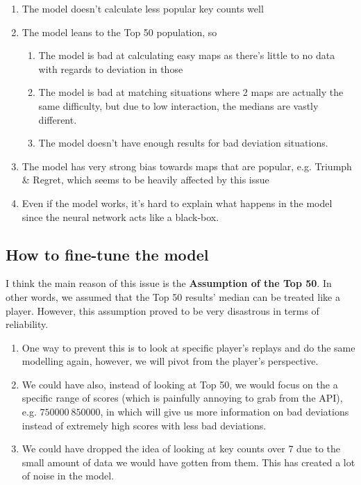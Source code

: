 \begin{enumerate}
	\item The model doesn't calculate less popular key counts well
	\item The model leans to the Top 50 population, so
	\begin{enumerate}
		\item The model is bad at calculating easy maps as there's little to no data with regards to deviation in those
		\item The model is bad at matching situations where 2 maps are actually the same difficulty, but due to low interaction, the medians are vastly different.
		\item The model doesn't have enough results for bad deviation situations.
	\end{enumerate}
	\item The model has very strong bias towards maps that are popular, e.g. Triumph \& Regret, which seems to be heavily affected by this issue
	\item Even if the model works, it's hard to explain what happens in the model since the neural network acts like a black-box.
\end{enumerate}

\subsection{How to fine-tune the model}

I think the main reason of this issue is the \textbf{Assumption of the Top 50}. In other words, we assumed that the Top 50 results' median can be treated like a player. However, this assumption proved to be very disastrous in terms of reliability.

\begin{enumerate}
	\item One way to prevent this is to look at specific player's replays and do the same modelling again, however, we will pivot from the player's perspective.
	\item We could have also, instead of looking at Top 50, we would focus on the a specific range of scores (which is painfully annoying to grab from the API), e.g. $ 750000 ~ 850000$, in which will give us more information on bad deviations instead of  extremely high scores with less bad deviations.
	\item We could have dropped the idea of looking at key counts over 7 due to the small amount of data we would have gotten from them. This has created a lot of noise in the model. 
\end{enumerate}





